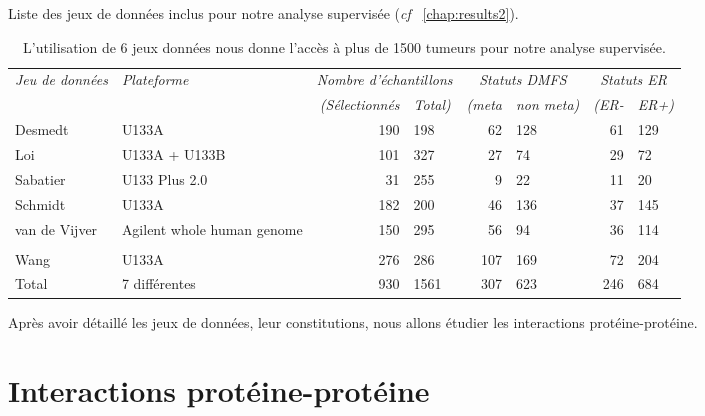 			\begin{table}
				\begin{center}
					\caption{Liste des jeux de données inclus pour notre analyse supervisée \citep{Garcia2012} (\emph{cf} ~\ref{chap:results2}).}
					\begin{tabular}{llr@{/}lr@{/}lr@{/}l}
						\toprule
						\emph{Jeu de données} & \emph{Plateforme}	& \multicolumn{2}{c}{\emph{Nombre d'échantillons}}	& \multicolumn{2}{c}{\emph{Statuts DMFS}} & \multicolumn{2}{c}{\emph{Statuts ER}} \\
						\cmidrule(r){3-8}
						&  & \emph{(Sélectionnés} & \emph{Total)}	& \emph{(meta} & \emph{non meta)} & \emph{(ER-}	& \emph{ER+)} \\
						\midrule
						Desmedt						& U133A												& 190	&198	& 62	& 128	& 61	& 129	\\
						Loi							& U133A + U133B										& 101	&327	& 27	& 74	& 29	& 72	\\
						Sabatier					& U133 Plus 2.0										& 31	&255	& 9		& 22	& 11	& 20	\\
						Schmidt						& U133A												& 182	&200	& 46	& 136	& 37	& 145	\\
						van de Vijver				& \multirow{2}{2.49cm}{Agilent whole human genome}	& 150	&295	& 56	& 94	& 36	& 114	\\
						& \\
						Wang						& U133A												& 276	&286	& 107	& 169	& 72	& 204	\\
						\midrule
						Total						& 7 différentes										& 930	&1561	& 307	& 623	& 246	& 684	\\
						\bottomrule
					\end{tabular}
					\label{tab:Met:DSS}
					\vspace{5ex}
					\caption*{L'utilisation de 6 jeux données nous donne l'accès à plus de 1500 tumeurs pour notre analyse supervisée.}
				\end{center}
			\end{table}

			Après avoir détaillé les jeux de données, leur constitutions, nous allons étudier les interactions protéine-protéine.

			\pagebreak

	\section{\textcolor{green!60!black}{Interactions protéine-protéine}}\label{sec:IPP}

